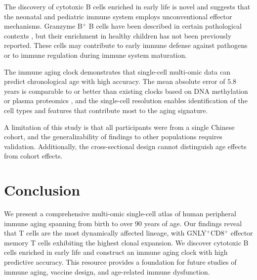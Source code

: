 \documentclass[11pt]{article}
\begin{document}
The discovery of cytotoxic B cells enriched in early life is novel and suggests that the neonatal and pediatric immune system employs unconventional effector mechanisms. Granzyme B$^+$ B cells have been described in certain pathological contexts \citep{glass2020unconventional}, but their enrichment in healthy children has not been previously reported. These cells may contribute to early immune defense against pathogens or to immune regulation during immune system maturation.

The immune aging clock demonstrates that single-cell multi-omic data can predict chronological age with high accuracy. The mean absolute error of 5.8 years is comparable to or better than existing clocks based on DNA methylation or plasma proteomics \citep{sayed2021immuneclock}, and the single-cell resolution enables identification of the cell types and features that contribute most to the aging signature.

A limitation of this study is that all participants were from a single Chinese cohort, and the generalizability of findings to other populations requires validation. Additionally, the cross-sectional design cannot distinguish age effects from cohort effects.

\section{Conclusion}

We present a comprehensive multi-omic single-cell atlas of human peripheral immune aging spanning from birth to over 90 years of age. Our findings reveal that T cells are the most dynamically affected lineage, with GNLY$^+$CD8$^+$ effector memory T cells exhibiting the highest clonal expansion. We discover cytotoxic B cells enriched in early life and construct an immune aging clock with high predictive accuracy. This resource provides a foundation for future studies of immune aging, vaccine design, and age-related immune dysfunction.



\end{document}
